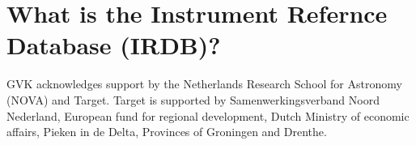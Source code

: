 \documentclass[11pt,twoside]{article}
\begin{document}
\begin{abstract}
\end{abstract}

\section{What is the Instrument Refernce Database (IRDB)?}


\acknowledgements
GVK acknowledges support by the Netherlands Research School for Astronomy (NOVA) and Target.
Target is supported by Samenwerkingsverband Noord Nederland, European fund for regional development, Dutch Ministry of economic affairs, Pieken in de Delta, Provinces of Groningen and Drenthe.


\end{document}
